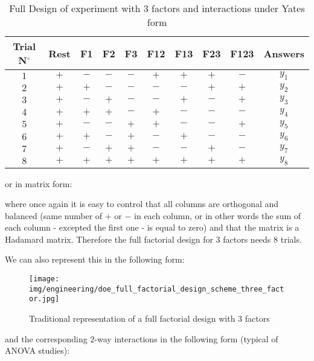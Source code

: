 	\begin{table}[H]\centering
	\begin{center}
			\begin{tabular}{|c|c|c|c|c|c|c|c|c|c|}
				\hline
				\multicolumn{1}{c}{\cellcolor{black!30}\textbf{Trial N${}^\circ$}} & 
  \multicolumn{1}{c}{\cellcolor{black!30}\textbf{Rest}} & 
  \multicolumn{1}{c}{\cellcolor{black!30}\textbf{F1}} & 
  \multicolumn{1}{c}{\cellcolor{black!30}\textbf{F2}} & 
  \multicolumn{1}{c}{\cellcolor{black!30}\textbf{F3}} & 
  \multicolumn{1}{c}{\cellcolor{black!30}\textbf{F12}} & 
  \multicolumn{1}{c}{\cellcolor{black!30}\textbf{F13}} & 
  \multicolumn{1}{c}{\cellcolor{black!30}\textbf{F23}} & 
  \multicolumn{1}{c}{\cellcolor{black!30}\textbf{F123}} & 
  \multicolumn{1}{c}{\cellcolor{black!30}\textbf{Answers}}\\ \hline
				$1$ & $+$ & $-$ & $-$ & $-$ & $+$ & $+$ & $+$ & $-$ & $y_1$\\ \hline
				$2$ & $+$ & $+$ & $-$ & $-$ & $-$ & $-$ & $+$ & $+$ & $y_2$\\ \hline
				$3$ & $+$ & $-$ & $+$ & $-$ & $-$ & $+$ & $-$ & $+$ & $y_3$\\ \hline
				$4$ & $+$ & $+$ & $+$ & $-$ & $+$ & $-$ & $-$ & $-$ & $y_4$\\ \hline
				$5$ & $+$ & $-$ & $-$ & $+$ & $+$ & $-$ & $-$ & $+$ & $y_5$\\ \hline
				$6$ & $+$ & $+$ & $-$ & $+$ & $-$ & $+$ & $-$ & $-$ & $y_6$\\ \hline
				$7$ & $+$ & $-$ & $+$ & $+$ & $-$ & $-$ & $+$ & $-$ & $y_7$\\ \hline
				$8$ & $+$ & $+$ & $+$ & $+$ & $+$ & $+$ & $+$ & $+$ & $y_8$\\ \hline
 		\end{tabular}
	\end{center}
	\caption{Full Design of experiment with $3$ factors and interactions under Yates form}
	\end{table}
	or in matrix form:
	
	where once again it is easy to control that all columns are orthogonal and balanced (same number of $+$ or $-$ in each column, or in other words the sum of each column - excepted the first one - is equal to zero) and that the matrix is a Hadamard matrix.	Therefore the full factorial design for $3$ factors needs $8$ trials.

	We can also represent this in the following form:
	\begin{figure}[H]
		\begin{center}
		\texttt{[image: img/engineering/doe\_full\_factorial\_design\_scheme\_three\_factor.jpg]}
		\end{center}	
		\caption{Traditional representation of a full factorial design with $3$ factors}
	\end{figure}
	and the corresponding $2$-way interactions in the following form (typical of ANOVA studies):
	\newcommand\drawplane[2]
	{%
	    \draw
	    [
	        thick,
	        opacity=.6,
	        draw=#2,
	        fill=#2!60,
	    ] #1 -- cycle;%
	}
	
